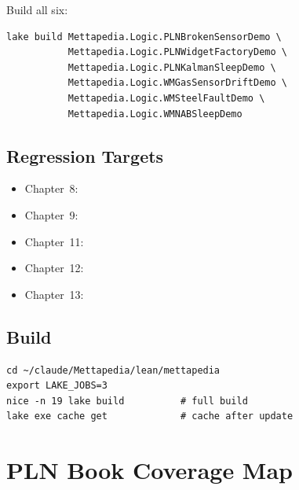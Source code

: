 \documentclass[11pt,openany]{report}
\begin{document}
\noindent
Build all six:
\begin{lstlisting}
lake build Mettapedia.Logic.PLNBrokenSensorDemo \
           Mettapedia.Logic.PLNWidgetFactoryDemo \
           Mettapedia.Logic.PLNKalmanSleepDemo \
           Mettapedia.Logic.WMGasSensorDriftDemo \
           Mettapedia.Logic.WMSteelFaultDemo \
           Mettapedia.Logic.WMNABSleepDemo
\end{lstlisting}

\section{Regression Targets}

\begin{itemize}
\item Chapter~8: 
\item Chapter~9: 
\item Chapter~11: 
\item Chapter~12: 
\item Chapter~13: 
\end{itemize}

\section{Build}

\begin{lstlisting}
cd ~/claude/Mettapedia/lean/mettapedia
export LAKE_JOBS=3
nice -n 19 lake build          # full build
lake exe cache get             # cache after update
\end{lstlisting}


\chapter{PLN Book Coverage Map}
\label{app:coverage-map}
\end{document}
